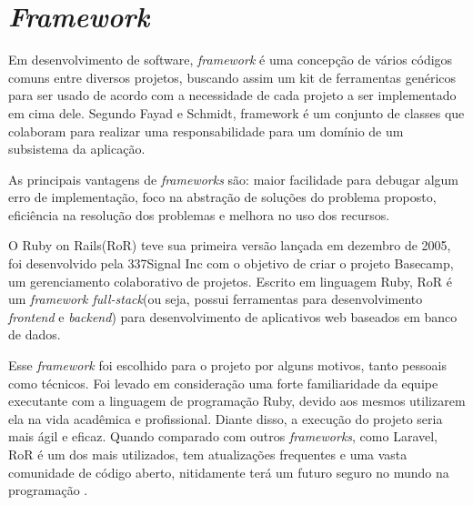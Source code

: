 



\section{\textit{Framework}}
Em desenvolvimento de software, \textit{framework} é uma concepção de vários códigos comuns entre diversos projetos, buscando assim um kit de ferramentas genéricos para ser usado de acordo com a necessidade de cada projeto a ser implementado em cima dele. Segundo Fayad e Schmidt, framework é um conjunto de classes que colaboram para realizar uma responsabilidade para um domínio de um subsistema da aplicação\cite{frameworkwikipedia}. \par
As principais vantagens de \textit{frameworks} são: maior facilidade para debugar algum erro de implementação, foco na abstração de soluções do problema proposto, eficiência na resolução dos problemas e melhora no uso dos recursos\cite{frameworkwikipedia}. \par
O Ruby on Rails(RoR) teve sua primeira versão lançada em dezembro de 2005, foi desenvolvido pela 337Signal Inc com o objetivo de criar o projeto Basecamp, um gerenciamento colaborativo de projetos. Escrito em linguagem Ruby, RoR é um \textit{framework full-stack}(ou seja, possui ferramentas para desenvolvimento \textit{frontend} e \textit{backend}) para desenvolvimento de aplicativos web baseados em banco de dados\cite{plekhanova2009evaluating}. \par
Esse \textit{framework} foi escolhido para o projeto por alguns motivos, tanto pessoais como técnicos. Foi levado em consideração uma forte familiaridade da equipe executante com a linguagem de programação Ruby, devido aos mesmos utilizarem ela na vida acadêmica e profissional. Diante disso, a execução do projeto seria mais ágil e eficaz. Quando comparado com outros \textit{frameworks}, como Laravel, RoR é um dos mais utilizados, tem atualizações frequentes e uma vasta comunidade de código aberto, nitidamente terá um futuro seguro no mundo na programação \cite{verma2014mvc}. \par
